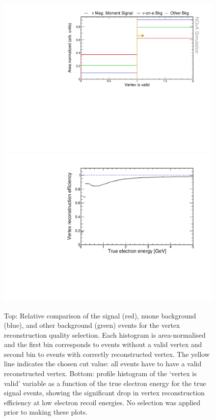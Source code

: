 \begin{figure}[hbtp]
\centering
\includegraphics[width=.9\textwidth]{Plots/NuMMEventSelection/N1Cut_vtxIsValid.pdf}
\includegraphics[width=.9\textwidth]{Plots/NuMMEventSelection/VtxIsValidNuMM.pdf}
\caption[Vertex reconstruction quality cut]{Top: Relative comparison of the signal (red), \acrshort{nuone} background (blue), and other background (green) events for the vertex reconstruction quality selection. Each histogram is area-normalised and the first bin corresponds to events without a valid vertex and second bin to events with correctly reconstructed vertex. The yellow line indicates the chosen cut value: all events have to have a valid reconstructed vertex. Bottom: profile histogram of the `vertex is valid' variable as a function of the true electron energy for the true signal events, showing the significant drop in vertex reconstruction efficiency at low electron recoil energies. No selection was applied prior to making these plots.}
\label{fig:NuMMCutsVertexIsValid}
\end{figure}


